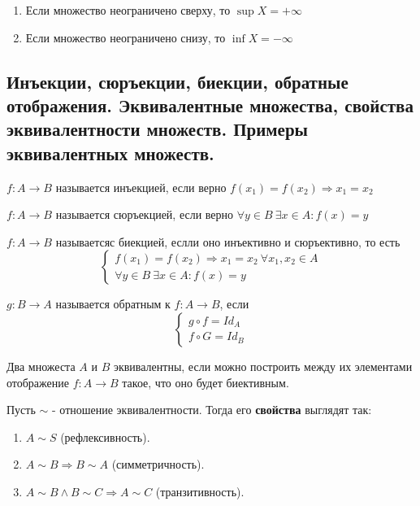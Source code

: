 \documentclass{article}
\begin{document}
\begin{enumerate}
	\item Если множество неограничено сверху, то $\sup X = +\infty$
	\item Если множество неограничено снизу, то $\inf X = -\infty$
\end{enumerate}

\subsection{Инъекции, сюръекции, биекции, обратные отображения. Эквивалентные множества, свойства эквивалентности множеств. Примеры эквивалентных множеств.}
 $f: A \to B$ называется инъекцией, если верно $f(x_1) = f(x_2) \Rightarrow x_1 = x_2$

 $f: A \to B$ называется сюръекцией, если верно $\forall y \in B\  \exists x \in A : f(x) = y$

 $f: A \to B$ называетсяс биекцией, еслли оно инъективно и сюръективно, то есть
\begin{equation*}
	\begin{cases}
		f(x_1) = f(x_2) \Rightarrow x_1 = x_2 \ \forall x_1,x_2 \in A\\
		\forall y \in B \ \exists x \in A : f(x) = y
	\end{cases}
\end{equation*} 


 $g: B \to A$ называется обратным к $f: A \to B$, если
\begin{equation*}
	\begin{cases}
		g \circ f = Id_A \\
		f \circ G = Id_B
	\end{cases}
\end{equation*}

 Два множеста $A$ и $B$ эквивалентны, если можно построить между их элементами отображение $f: A \to B$ такое, что оно будет биективным.

\noindent Пусть $\sim$ - отношение эквивалентности. Тогда его {\bf свойства} выглядят так:
\begin{enumerate}
	\item $A \sim S$ (рефлексивность).
	\item $A \sim B \Rightarrow B \sim A$ (симметричность).
	\item $A \sim B \wedge B \sim C \Rightarrow A \sim C$ (транзитивность).
\end{enumerate}
\end{document}
